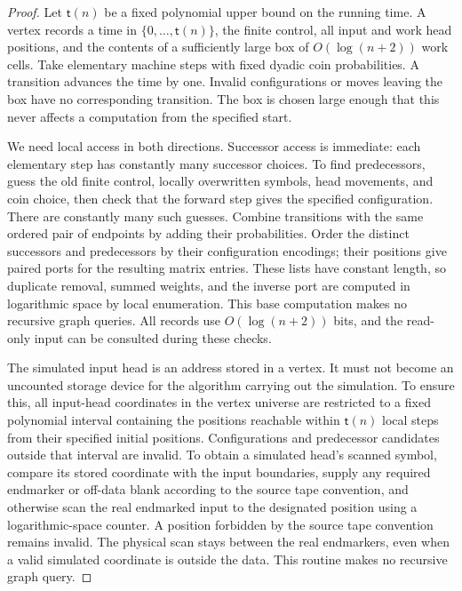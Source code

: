 \documentclass[11pt]{article}
\numberwithin{equation}{section}
\theoremstyle{definition}
\theoremstyle{remark}
\begin{document}
\begin{proof}
Let ${\mathsf{t}}(n)$ be a fixed polynomial upper bound on the running time.
A vertex records a time in $\{0,\ldots,{\mathsf{t}}(n)\}$, the finite control,
all input and work head positions, and the contents of a sufficiently
large box of $O(\log(n+2))$ work cells. Take elementary machine steps
with fixed dyadic coin probabilities. A transition advances the time
by one. Invalid configurations or moves leaving the box have no
corresponding transition. The box is chosen large enough that this
never affects a computation from the specified start.

We need local access in both directions. Successor access is immediate: each elementary step has constantly many successor choices.
To find predecessors, guess the old finite control, locally overwritten
symbols, head movements, and coin choice, then check that the forward
step gives the specified configuration. There are constantly many such
guesses. Combine transitions with the same ordered pair of endpoints
by adding their probabilities. Order the distinct successors and
predecessors by their configuration encodings; their positions give
paired ports for the resulting matrix entries. These lists have
constant length, so duplicate removal, summed weights, and the inverse
port are computed in logarithmic space by local enumeration. This
base computation makes no recursive graph queries. All records use
$O(\log(n+2))$ bits, and the read-only input can be consulted during
these checks.

The simulated input head is an address stored in a vertex. It must not become an uncounted storage device for the algorithm carrying out the simulation. To ensure this, all input-head coordinates in the vertex universe are restricted to a
fixed polynomial interval containing the positions reachable within
${\mathsf{t}}(n)$ local steps from their specified initial positions. Configurations
and predecessor candidates outside that interval are invalid. To obtain
a simulated head's scanned symbol, compare its stored coordinate with
the input boundaries, supply any required endmarker or off-data blank
according to the source tape convention, and otherwise scan the real
endmarked input to the designated position using a logarithmic-space
counter. A position forbidden by the source tape convention remains
invalid. The physical scan stays between the real endmarkers, even when
a valid simulated coordinate is outside the data. This routine makes
no recursive graph query.


\end{proof}
\end{document}
